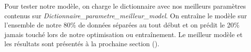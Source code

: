 Pour tester notre modèle, on charge le dictionnaire avec nos meilleurs paramètres contenus sur \emph{Dictionnaire\_parametre\_meilleur\_model}. On entraîne le modèle sur l'ensemble de notre 80\% de données séparées au tout début et on prédit le 20\% jamais touché lors de notre optimisation ou entraînement. Le meilleur modèle et les résultats sont présentés à la prochaine section ().